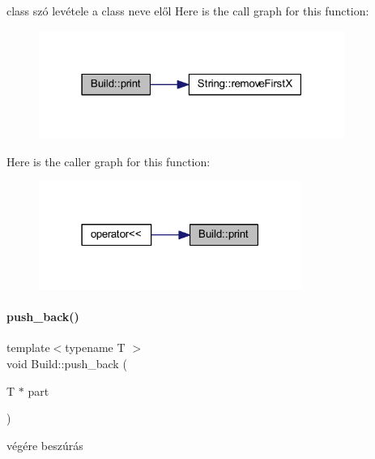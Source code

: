 class szó levétele a class neve elől Here is the call graph for this function\+:
\nopagebreak
\begin{figure}[H]
\begin{center}
\leavevmode
\includegraphics[width=283pt]{class_build_adb328444dd8bf97b36356be36db01194_cgraph}
\end{center}
\end{figure}
Here is the caller graph for this function\+:
\nopagebreak
\begin{figure}[H]
\begin{center}
\leavevmode
\includegraphics[width=243pt]{class_build_adb328444dd8bf97b36356be36db01194_icgraph}
\end{center}
\end{figure}
\mbox{\label{class_build_aba0548391a8c613ed2a9d81d4d3b2a4b}} 
\paragraph{\texorpdfstring{push\_back()}{push\_back()}}
{\footnotesize\ttfamily template$<$typename T $>$ \\
void Build\+::push\+\_\+back (\begin{DoxyParamCaption}\item[{T $\ast$}]{part }\end{DoxyParamCaption})\hspace{0.3cm}{\ttfamily [inline]}}



végére beszúrás 

